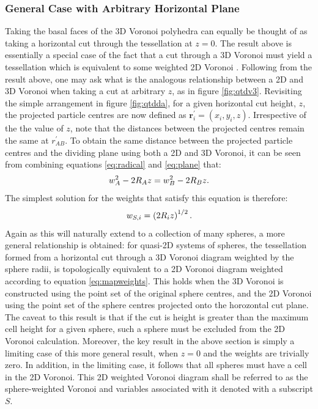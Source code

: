 \subsubsection{General Case with Arbitrary Horizontal Plane}

Taking the basal faces of the 3D Voronoi polyhedra can equally be thought of as taking a horizontal cut through the tessellation at $z=0$.
The result above is essentially a special case of the fact that a cut through a 3D Voronoi must yield a tessellation which is equivalent to some weighted 2D Voronoi \cite{Imai1985,Rivier1990}.
Following from the result above, one may ask what is the analogous relationship between a 2D and 3D Voronoi when taking a cut at arbitrary $z$, as in figure \ref{fig:qtdv3}.
Revisiting the simple arrangement in figure \ref{fig:qtdda}, for a given horizontal cut height, $z$, the projected particle centres are now defined as $\mathbf{r}_i^\prime=\left(x_i,y_i,z\right)$.
Irrespective of the the value of $z$, note that the distances between the projected centres remain the same at $r_{AB}^\prime$.
To obtain the same distance between the projected particle centres and the dividing plane using both a 2D and 3D Voronoi, it can be seen from combining equations \eqref{eq:radical} and \eqref{eq:plane} that:
\begin{equation}
	\label{eq:condition}
	w_A^2-2R_Az = w_B^2-2R_Bz.
\end{equation}
The simplest solution for the weights that satisfy this equation is therefore:
\begin{equation}
	\label{eq:mapweights}
	w_{S,i} = \left(2R_iz\right)^{1/2}.
\end{equation}
Again as this will naturally extend to a collection of many spheres, a more general relationship is obtained: for quasi\--2D systems of spheres, the tessellation formed from a horizontal cut through a 3D Voronoi diagram weighted by the sphere radii, is topologically equivalent to a 2D Voronoi diagram weighted according to equation \eqref{eq:mapweights}.
This holds when the 3D Voronoi is constructed using the point set of the original sphere centres, and the 2D Voronoi using the point set of the sphere centres projected onto the horozontal cut plane. 
The caveat to this result is that if the cut is height is greater than the maximum cell height for a given sphere, such a sphere must be excluded from the 2D Voronoi calculation.
Moreover, the key result in the above section is simply a limiting case of this more general result, when $z = 0$ and the weights are trivially zero. 
In addition, in the limiting case, it follows that all spheres must have a cell in the 2D Voronoi.
This 2D weighted Voronoi diagram shall be referred to as the sphere\--weighted Voronoi and variables associated with it denoted with a subscript $S$.

